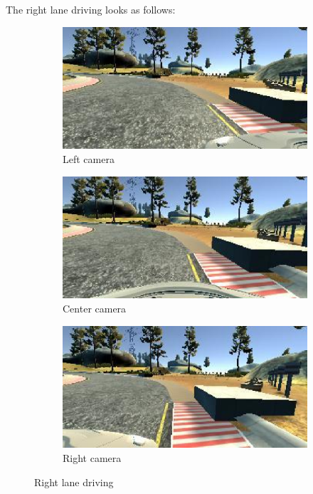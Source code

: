 \documentclass[a4paper,12pt]{article}
\begin{document}
The right lane driving looks as follows:
\begin{figure}[H]
\centering
\begin{subfigure}{.3\textwidth}
  \centering
  \includegraphics[width=0.98\linewidth]{figures/right_left.eps}
  \caption{Left camera}
\end{subfigure}
\begin{subfigure}{.3\textwidth}
  \centering
  \includegraphics[width=0.98\linewidth]{figures/right_center.eps}
  \caption{Center camera}
\end{subfigure}
\begin{subfigure}{.3\textwidth}
  \centering
  \includegraphics[width=0.98\linewidth]{figures/right_right.eps}
  \caption{Right camera}
\end{subfigure}
\label{fig:right_lane_driving}
\caption{Right lane driving}
\end{figure}
\end{document}
